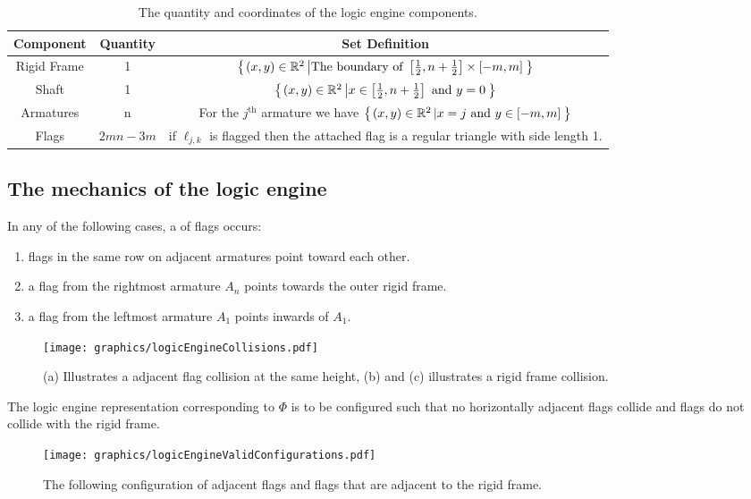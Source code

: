\begin{center}
	\begin{table}\label{LogicEngineV3PolynomialTable}
		\begin{tabular}{|c|c|c|}%
			\hline
			Component & Quantity &  Set Definition\\ \hline
			Rigid Frame&1&${\left\lbrace \left. (x,y)\in{\mathbb{R}}^2 \left\vert  \text{The boundary of }\left[ \frac{1}{2} , n + \frac{1}{2}\right] \times \left[ -m, m \right] \right.\right.\right\rbrace }$\\ \hline
			Shaft&1&${\left\lbrace \left. (x,y) \in {\mathbb{R}}^2 \left\vert x \in \left[\frac{1}{2}, n + \frac{1}{2}\right] \text{ and } y=0  \right.\right.\right\rbrace }$\\ \hline
			Armatures & n & For the $j^\text{th}$ armature we have ${\left\lbrace \left. (x,y)\in{\mathbb{R}}^2 \left\vert x = j \text{ and } y \in [-m,m]  \right.\right.\right\rbrace }$\\ \hline
			Flags&$2mn-3m$& if $\ell_{j,k}$ is flagged then the attached flag is a regular triangle with side length 1.\\ \hline
		\end{tabular}
	\caption{The quantity and coordinates of the logic engine components.}
	\end{table}
\end{center}

\subsection{The mechanics of the logic engine}
In any of the following cases, a  of flags occurs:
\begin{enumerate}
\item flags in the same row on adjacent armatures point toward each other.
\item a flag from the rightmost armature $A_n$ points towards the outer rigid frame.
\item a flag from the leftmost armature $A_1$ points inwards of $A_1$.
\end{enumerate}

\begin{figure}[!htbp]
\begin{center}
\texttt{[image: graphics/logicEngineCollisions.pdf]}
\caption{(a) Illustrates a adjacent flag collision at the same height, (b) and (c) illustrates a 
rigid frame collision.}\label{fig:logicEngineCollisionsSmall.pdf}
\end{center}
\end{figure}
The logic engine representation corresponding to $\Phi$ is to be configured such that no 
horizontally adjacent flags collide and flags do not collide with the rigid frame. 
\begin{figure}[!htbp]
\begin{center}
\texttt{[image: graphics/logicEngineValidConfigurations.pdf]}
\caption{The following configuration of adjacent flags 
and flags that are adjacent to the rigid frame.}\label{fig:logicEngineValidConfigurations.pdf}
\end{center}
\end{figure}


